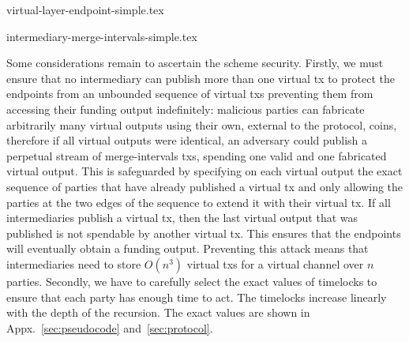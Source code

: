   \addtolength{\intextsep}{-15pt}
  \begin{figure*}[!htbp]
    \begin{minipage}{.48\textwidth}
    {virtual-layer-endpoint-simple.tex}
    \caption{$A$--$E$ virtual channel: $A$'s initiator transaction. Spends the
    funding output of the $A$--$B$ channel. $A$ can use it if $B$ has not published
    a virtual transaction.}
    \label{figure:virtual-layer-endpoint-simple}
    \end{minipage}\hspace{10pt}%
    \begin{minipage}{.49\textwidth}
    {intermediary-merge-intervals-simple.tex}
    \caption{$A$--$E$ virtual channel: One of $B$'s merge intervals
    transactions. Spends the virtual outputs of $A$'s and $C$'s virtual
    transactions. $B$ can use it if both $A$ and $C$ have already published
    their initiator or extend-interval transactions.}
    \label{figure:virtual-layer-merge-intervals-simple}
    \end{minipage}
  \end{figure*}
  \addtolength{\intextsep}{15pt}

  Some considerations remain to ascertain the scheme security.
  Firstly, we must ensure that no intermediary can publish more than
  one virtual tx to protect the endpoints from an unbounded sequence of virtual
  txs preventing them from accessing their funding output indefinitely:
  malicious parties can fabricate arbitrarily many virtual outputs using
  their own, external to the protocol, coins, therefore if all virtual outputs
  were identical, an adversary could publish a perpetual stream of
  merge-intervals txs, spending one valid and one fabricated virtual output.
  This is safeguarded by
  specifying on each virtual output the exact sequence of parties that have
  already published a virtual tx and only allowing the parties at the two edges
  of the sequence
  to extend it with their virtual tx. If all intermediaries publish a virtual
  tx, then the last virtual output that was published is not spendable by
  another virtual
  tx. This ensures that the endpoints will eventually obtain a funding
  output. Preventing this attack means that intermediaries need to store
  $O(n^3)$ virtual txs for a virtual channel over $n$ parties. Secondly,
  we have to carefully select the exact values of timelocks to ensure that
  each party has enough time to act. The timelocks increase linearly
  with the depth of the recursion. The exact values are shown in
  Appx.~\ref{sec:pseudocode} and~\ref{sec:protocol}.

